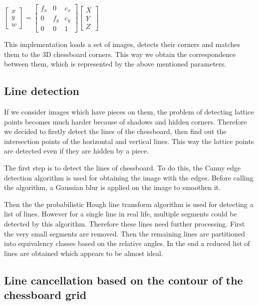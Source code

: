\documentclass[conference]{IEEEtran}
\begin{document}
\begin{center}
\begin{math} 
\begin{bmatrix}
x\\
y\\
w
\end{bmatrix}
=
\begin{bmatrix}
f_x & 0 & c_x\\
0 & f_y & c_y\\
0 & 0 & 1
\end{bmatrix}
\begin{bmatrix}
X\\
Y\\
Z
\end{bmatrix}
\end{math} 
\end{center}

This implementation loads a set of images, detects their corners and matches them to the 3D chessboard corners. This way we obtain the correspondence between them, which is represented by the above mentioned parameters.

\subsection{Line detection}

If we consider images which have pieces on them, the problem of detecting lattice points becomes much harder because of shadows and hidden corners. Therefore we decided to firstly detect the lines of the chessboard, then find out the intersection points of the horizontal and vertical lines. This way the lattice points are detected even if they are hidden by a piece.

The first step is to detect the lines of chessboard. To do this, the Canny edge detection algorithm is used for obtaining the image with the edges. Before calling the algorithm, a Gaussian blur is applied on the image to smoothen it.

Then the the probabilistic Hough line transform algorithm is used for detecting a list of lines. However for a single line in real life, multiple segments could be detected by this algorithm. Therefore these lines need further processing. First the very small segments are removed. Then the remaining lines are partitioned into equivalency classes based on the relative angles. In the end a reduced list of lines are obtained which appears to be almost ideal.

\subsection{Line cancellation based on the contour of the chessboard grid}
\end{document}
